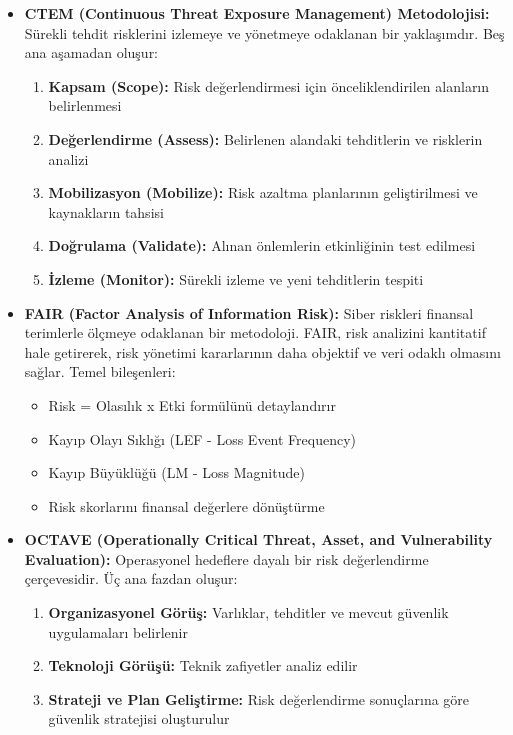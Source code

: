 \begin{itemize}
\item \textbf{CTEM (Continuous Threat Exposure Management) Metodolojisi:} Sürekli tehdit risklerini izlemeye ve yönetmeye odaklanan bir yaklaşımdır. Beş ana aşamadan oluşur:
\begin{enumerate}
    \item \textbf{Kapsam (Scope):} Risk değerlendirmesi için önceliklendirilen alanların belirlenmesi
    \item \textbf{Değerlendirme (Assess):} Belirlenen alandaki tehditlerin ve risklerin analizi
    \item \textbf{Mobilizasyon (Mobilize):} Risk azaltma planlarının geliştirilmesi ve kaynakların tahsisi
    \item \textbf{Doğrulama (Validate):} Alınan önlemlerin etkinliğinin test edilmesi
    \item \textbf{İzleme (Monitor):} Sürekli izleme ve yeni tehditlerin tespiti
\end{enumerate}

\item \textbf{FAIR (Factor Analysis of Information Risk):} Siber riskleri finansal terimlerle ölçmeye odaklanan bir metodoloji. FAIR, risk analizini kantitatif hale getirerek, risk yönetimi kararlarının daha objektif ve veri odaklı olmasını sağlar. Temel bileşenleri:
\begin{itemize}
    \item Risk = Olasılık x Etki formülünü detaylandırır
    \item Kayıp Olayı Sıklığı (LEF - Loss Event Frequency)
    \item Kayıp Büyüklüğü (LM - Loss Magnitude)
    \item Risk skorlarını finansal değerlere dönüştürme
\end{itemize}

\item \textbf{OCTAVE (Operationally Critical Threat, Asset, and Vulnerability Evaluation):} Operasyonel hedeflere dayalı bir risk değerlendirme çerçevesidir. Üç ana fazdan oluşur:
\begin{enumerate}
    \item \textbf{Organizasyonel Görüş:} Varlıklar, tehditler ve mevcut güvenlik uygulamaları belirlenir
    \item \textbf{Teknoloji Görüşü:} Teknik zafiyetler analiz edilir
    \item \textbf{Strateji ve Plan Geliştirme:} Risk değerlendirme sonuçlarına göre güvenlik stratejisi oluşturulur
\end{enumerate}
\end{itemize}

